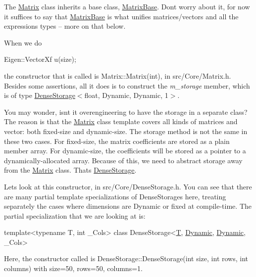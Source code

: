 The \hyperlink{group___core___module_class_eigen_1_1_matrix}{Matrix} class inherits a base class, \hyperlink{group___core___module_class_eigen_1_1_matrix_base}{Matrix\+Base}. Don\textquotesingle{}t worry about it, for now it suffices to say that \hyperlink{group___core___module_class_eigen_1_1_matrix_base}{Matrix\+Base} is what unifies matrices/vectors and all the expressions types -- more on that below.

When we do 
\begin{DoxyCode}
Eigen::VectorXf u(size);
\end{DoxyCode}
 the constructor that is called is Matrix\+::\+Matrix(int), in src/\+Core/\+Matrix.\+h. Besides some assertions, all it does is to construct the {\itshape m\+\_\+storage} member, which is of type \hyperlink{class_eigen_1_1_dense_storage}{Dense\+Storage}$<$float, Dynamic, Dynamic, 1$>$.

You may wonder, isn\textquotesingle{}t it overengineering to have the storage in a separate class? The reason is that the \hyperlink{group___core___module_class_eigen_1_1_matrix}{Matrix} class template covers all kinds of matrices and vector\+: both fixed-\/size and dynamic-\/size. The storage method is not the same in these two cases. For fixed-\/size, the matrix coefficients are stored as a plain member array. For dynamic-\/size, the coefficients will be stored as a pointer to a dynamically-\/allocated array. Because of this, we need to abstract storage away from the \hyperlink{group___core___module_class_eigen_1_1_matrix}{Matrix} class. That\textquotesingle{}s \hyperlink{class_eigen_1_1_dense_storage}{Dense\+Storage}.

Let\textquotesingle{}s look at this constructor, in src/\+Core/\+Dense\+Storage.\+h. You can see that there are many partial template specializations of Dense\+Storages here, treating separately the cases where dimensions are Dynamic or fixed at compile-\/time. The partial specialization that we are looking at is\+: 
\begin{DoxyCode}
\textcolor{keyword}{template}<\textcolor{keyword}{typename} T, \textcolor{keywordtype}{int} \_Cols> \textcolor{keyword}{class }DenseStorage<\hyperlink{group___sparse_core___module_class_eigen_1_1_triplet}{T}, \hyperlink{namespace_eigen_ad81fa7195215a0ce30017dfac309f0b2}{Dynamic}, \hyperlink{namespace_eigen_ad81fa7195215a0ce30017dfac309f0b2}{Dynamic}, \_Cols>
\end{DoxyCode}


Here, the constructor called is Dense\+Storage\+::\+Dense\+Storage(int size, int rows, int columns) with size=50, rows=50, columns=1.

